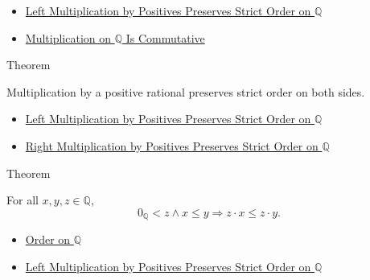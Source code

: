 \begin{dependencies}
\begin{itemize}
  \item \hyperref[thm:left-positive-multiplication-preserves-strict-order-on-q]{Left Multiplication by Positives Preserves Strict Order on $\mathbb{Q}$}
  \item \hyperref[thm:multiplication-on-q-commutative]{Multiplication on $\mathbb{Q}$ Is Commutative}
\end{itemize}
\end{dependencies}

\begin{theorembox}{Theorem}
\begin{theorem}
\label{thm:positive-multiplication-preserves-strict-order-on-q}
Multiplication by a positive rational preserves strict order on both sides.
\end{theorem}
\end{theorembox}

\begin{dependencies}
\begin{itemize}
  \item \hyperref[thm:left-positive-multiplication-preserves-strict-order-on-q]{Left Multiplication by Positives Preserves Strict Order on $\mathbb{Q}$}
  \item \hyperref[cor:right-positive-multiplication-preserves-strict-order-on-q]{Right Multiplication by Positives Preserves Strict Order on $\mathbb{Q}$}
\end{itemize}
\end{dependencies}

\begin{theorembox}{Theorem}
\begin{theorem}
\label{thm:left-positive-multiplication-preserves-order-on-q}
For all $x,y,z\in\mathbb{Q}$,
\[
0_{\mathbb{Q}}<z\land x\le y
\Longrightarrow
z\cdot x\le z\cdot y.
\]
\end{theorem}
\end{theorembox}

\begin{dependencies}
\begin{itemize}
  \item \hyperref[def:order-on-q]{Order on $\mathbb{Q}$}
  \item \hyperref[thm:left-positive-multiplication-preserves-strict-order-on-q]{Left Multiplication by Positives Preserves Strict Order on $\mathbb{Q}$}
\end{itemize}
\end{dependencies}

